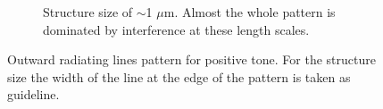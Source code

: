 \begin{figure}[htb]
\begin{subfigure}[t]{0.32\linewidth}
  	\label{fig:b2d2_q2}
  \end{subfigure}
 \hfill
     \begin{subfigure}[t]{0.32\linewidth}
  	\centering
  	\caption{Structure size of $\sim$1 $\mu$m. Almost the whole pattern is dominated by interference at these length scales.}
  	\label{fig:b2d3_q3}
  \end{subfigure}
\caption{Outward radiating lines pattern for positive tone. For the structure size the width of the line at the edge of the pattern is taken as guideline.}
 \end{figure}

